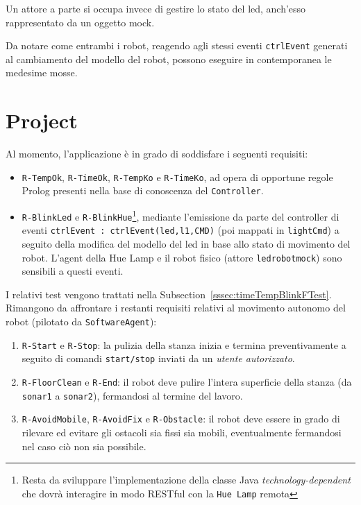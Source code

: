 \documentclass{../llncs}
\newcommand{\codescript}[1]{{\mbox{\small{\texttt{#1}}}}\xspace}
\newcommand{\code}[1]{{\color{blue}\small{\texttt{#1}}}}
\newcommand{\labelsec}[1]{\label{sec:#1}}
\newcommand{\xsss}[1]{\subsectionname~\ref{sssec:#1}}
\newcommand{\subsectionname}{Subsection}
\begin{document}
Un attore a parte si occupa invece di gestire lo stato del led, anch'esso rappresentato da un oggetto mock.\\



\vspace{8px}

Da notare come entrambi i robot, reagendo agli stessi eventi \codescript{ctrlEvent} generati al cambiamento del modello del robot, possono eseguire in contemporanea le medesime mosse.

\section{Project}
\labelsec{Project}
Al momento, l'applicazione è in grado di soddisfare i seguenti requisiti:
\begin{itemize}
\item \code{R-TempOk}, \code{R-TimeOk}, \code{R-TempKo} e \code{R-TimeKo}, ad opera di opportune regole Prolog presenti nella base di conoscenza del \texttt{Controller}.
\item \code{R-BlinkLed} e \code{R-BlinkHue}\footnote{Resta da sviluppare l'implementazione della classe Java \emph{technology-dependent} che dovrà interagire in modo RESTful con la \texttt{Hue Lamp} remota}, mediante l'emissione da parte del controller di eventi \codescript{ctrlEvent : ctrlEvent(led,l1,CMD)} (poi mappati in \codescript{lightCmd}) a seguito della modifica del modello del led in base allo stato di movimento del robot. L'agent della Hue Lamp e il robot fisico (attore \codescript{ledrobotmock}) sono sensibili a questi eventi.
\end{itemize}

I relativi test vengono trattati nella \xsss{timeTempBlinkFTest}.\\

Rimangono da affrontare i restanti requisiti relativi al movimento autonomo del robot (pilotato da \texttt{SoftwareAgent}):
\begin{enumerate}
\item \code{R-Start} e \code{R-Stop}: la pulizia della stanza inizia e termina preventivamente a seguito di comandi \texttt{start/stop} inviati da un \emph{utente autorizzato}.
\item \code{R-FloorClean} e \code{R-End}: il robot deve pulire l'intera superficie della stanza (da \code{sonar1} a \code{sonar2}), fermandosi al termine del lavoro.
\item \code{R-AvoidMobile}, \code{R-AvoidFix} e \code{R-Obstacle}: il robot deve essere in grado di rilevare ed evitare gli ostacoli sia fissi sia mobili, eventualmente fermandosi nel caso ciò non sia possibile.
\end{enumerate}
\end{document}
